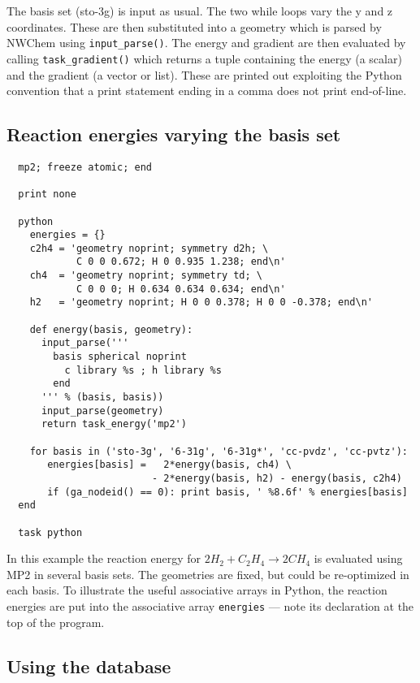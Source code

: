 The basis set (sto-3g) is input as usual.  The two while loops vary
the y and z coordinates.  These are then substituted into a geometry
which is parsed by NWChem using \verb+input_parse()+.  The energy and
gradient are then evaluated by calling \verb+task_gradient()+ which
returns a tuple containing the energy (a scalar) and the gradient (a
vector or list).  These are printed out exploiting the Python
convention that a print statement ending in a comma does not print
end-of-line.

\subsection{Reaction energies varying the basis set}

\begin{verbatim}
  mp2; freeze atomic; end

  print none

  python
    energies = {}
    c2h4 = 'geometry noprint; symmetry d2h; \
            C 0 0 0.672; H 0 0.935 1.238; end\n'
    ch4  = 'geometry noprint; symmetry td; \
            C 0 0 0; H 0.634 0.634 0.634; end\n'
    h2   = 'geometry noprint; H 0 0 0.378; H 0 0 -0.378; end\n'

    def energy(basis, geometry):
      input_parse('''
        basis spherical noprint
          c library %s ; h library %s 
        end
      ''' % (basis, basis))
      input_parse(geometry)
      return task_energy('mp2')

    for basis in ('sto-3g', '6-31g', '6-31g*', 'cc-pvdz', 'cc-pvtz'):
       energies[basis] =   2*energy(basis, ch4) \
                         - 2*energy(basis, h2) - energy(basis, c2h4)
       if (ga_nodeid() == 0): print basis, ' %8.6f' % energies[basis]
  end 

  task python
\end{verbatim}

In this example the reaction energy for 
$2H_2 + C_2H_4 \rightarrow 2CH_4$ is evaluated using MP2 in several
basis sets.  The geometries are fixed, but could be re-optimized in
each basis.  To illustrate the useful associative arrays in Python,
the reaction energies are put into the associative array
\verb+energies+ --- note its declaration at the top of the program.

\subsection{Using the database}

